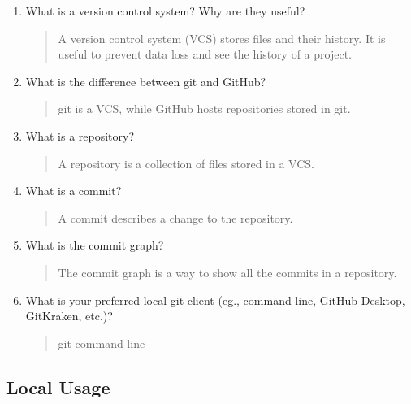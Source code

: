 \documentclass[10pt,twocolumn]{article}
\begin{document}
\begin{enumerate}
    \item What is a version control system? Why are they useful?
        \begin{quote}
            A version control system (VCS) stores files and their history.
            It is useful to prevent data loss and see the history of a project.
        \end{quote}
    \item What is the difference between git and GitHub?
        \begin{quote}
            git is a VCS, while GitHub hosts repositories stored in git.
        \end{quote}
    \item What is a repository?
        \begin{quote}
            A repository is a collection of files stored in a VCS.
        \end{quote}
    \item What is a commit?
        \begin{quote}
            A commit describes a change to the repository.
        \end{quote}
    \item What is the commit graph?
        \begin{quote}
            The commit graph is a way to show all the commits in a repository.
        \end{quote}
    \item What is your preferred local git client (eg., command line, GitHub Desktop, GitKraken, etc.)?
        \begin{quote}
            git command line
        \end{quote}
\end{enumerate}

\subsection{Local Usage}
\end{document}
